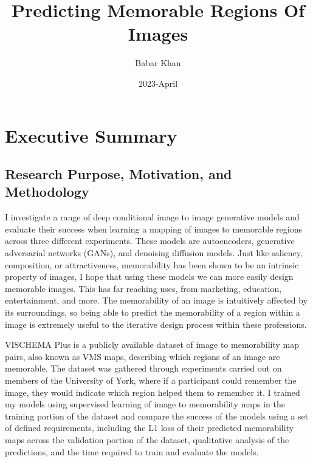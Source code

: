 \documentclass{UoYCSproject}
\author{Babar Khan}
\title{Predicting Memorable Regions Of Images}
\date{2023-April}
\begin{document}
\maketitle
\thispagestyle{empty}

\chapter{Executive Summary}
\setcounter{page}{1}



\section{Research Purpose, Motivation, and Methodology}

I investigate a range of deep conditional image to image generative models and evaluate their success when learning a mapping of images to memorable regions across three different experiments. These models are autoencoders, generative adversarial networks (GANs), and denoising diffusion models.
Just like saliency, composition, or attractiveness, memorability has been shown to be an intrinsic property of images, I hope that using these models we can more easily design memorable images. This has far reaching uses, from marketing, education, entertainment, and more. The memorability of an image is intuitively affected by its surroundings, so being able to predict the memorability of a region within a image is extremely useful to the iterative design process within these professions.  

VISCHEMA Plus is a publicly available dataset of image to memorability map pairs, also known as VMS maps, describing which regions of an image are memorable. The dataset was gathered through experiments carried out on members of the University of York, where if a participant could remember the image, they would indicate which region helped them to remember it. I trained my models using supervised learning of image to memorability maps in the training portion of the dataset and compare the success of the models using a set of defined requirements, including the L1 loss of their predicted memorability maps across the validation portion of the dataset, qualitative analysis of the predictions, and the time required to train and evaluate the models.
\end{document}
